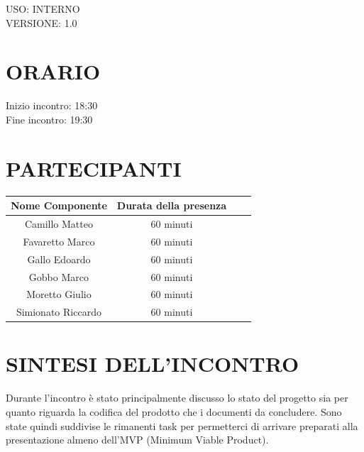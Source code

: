\documentclass[5pt]{article}
\begin{document}
\begin{flushright}
    \begin{spacing}{1}
        USO: INTERNO\\
        VERSIONE: 1.0\\
    \end{spacing}
\end{flushright}


\restoregeometry

\pagebreak


\section{ORARIO}
\begin{spacing}{1.5}
    {\large Inizio incontro: 18:30}\\
    {\large Fine incontro: 19:30} 
\end{spacing}

\section{PARTECIPANTI}
\setlength\cellspacetoplimit{6pt}
\setlength\cellspacebottomlimit{6pt}

\begin{table}[ht]
  \begin{tabular}{|Sc|Sc|}
    \hline
    \textbf{Nome Componente} & \textbf{Durata della presenza} \\
    \hline
    Camillo Matteo & 60 minuti \\
    Favaretto Marco & 60 minuti \\
    Gallo Edoardo & 60 minuti \\
    Gobbo Marco & 60 minuti \\
    Moretto Giulio & 60 minuti \\
    Simionato Riccardo & 60 minuti \\
    \hline
  \end{tabular}
  \label{tab:conference}
\end{table}

\section{SINTESI DELL'INCONTRO}
Durante l'incontro è stato principalmente discusso lo stato del progetto sia per quanto riguarda la codifica del prodotto che i documenti da concludere. Sono state quindi suddivise le rimanenti task per permetterci di arrivare preparati alla presentazione almeno dell'MVP (Minimum Viable Product).
\end{document}
